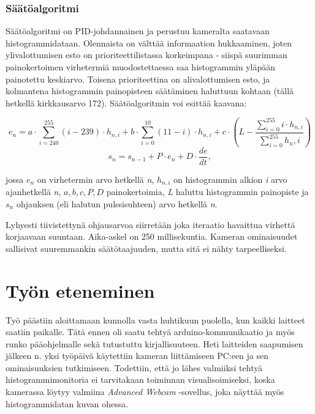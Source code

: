 \documentclass[finnish,12pt]{article}
\begin{document}
\subsubsection{Säätöalgoritmi}

Säätöalgoritmi on PID-johdannainen ja perustuu kameralta saatavaan histogrammidataan. Olennaista on välttää informaation hukkaaminen, joten ylivalottumisen esto on prioriteettilistassa korkeimpana - siispä suurimman painokertoimen virhetermiä muodostettaessa saa histogrammin yläpään painotettu keskiarvo. Toisena prioriteettina on alivalottumisen esto, ja kolmantena histogrammin painopisteen säätäminen haluttuun kohtaan (tällä hetkellä kirkkausarvo 172). Säätöalgoritmin voi esittää kaavana:

\begin{equation}
 e_n = a \cdot \sum_{i=240}^{255} (i - 239) \cdot h_{n,i} + b \cdot \sum_{i=0}^{10} (11-i) \cdot h_{n,i} + c \cdot (L - \frac{\sum_{i=0}^{255}i \cdot h_{n,i}}{\sum_{i=0}^{255}h_n,i})
\end{equation}
\begin{equation}
 s_n = s_{n-1} + P \cdot e_n + D \cdot \frac{de}{dt} ,
\end{equation}

jossa $e_n$ on virhetermin arvo hetkellä \textit{n}, $h_{n,i}$ on histogrammin alkion \textit{i} arvo ajanhetkellä \textit{n}, $a, b, c, P, D$ painokertoimia, \textit{L} haluttu histogrammin painopiste ja $s_n$ ohjauksen (eli halutun pulssisuhteen) arvo hetkellä \textit{n}.

Lyhyesti tiivistettynä ohjausarvoa siirretään joka iteraatio havaittua virhettä korjaavaan suuntaan. Aika-askel on 250 millisekuntia. Kameran ominaisuudet sallisivat suuremmankin säätötaajuuden, mutta sitä ei nähty tarpeelliseksi.

\section{Työn eteneminen}

Työ päästiin aloittamaan kunnolla vasta huhtikuun puolella, kun kaikki laitteet saatiin paikalle. Tätä ennen oli saatu tehtyä arduino-kommunikaatio ja myös runko pääohjelmalle sekä tutustuttu kirjallisuuteen. Heti laitteiden saapumisen jälkeen n. yksi työpäivä käytettiin kameran liittämiseen PC:een ja sen ominaisuuksien tutkimiseen. Todettiin, että jo lähes valmiiksi tehtyä histogrammimonitoria ei tarvitakaan toiminnan visualisoimiseksi, koska kamerassa löytyy valmiina \textit{Advanced Webcam} -sovellus, joka näyttää myös histogrammidatan kuvan ohessa.
\end{document}

